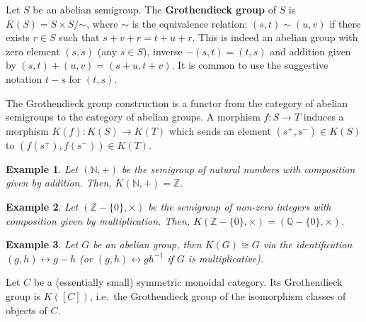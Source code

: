 \documentclass[12pt]{article}
\newcommand*{\Nset}{\mathbb{N}}
\newcommand*{\Zset}{\mathbb{Z}}
\newcommand*{\Qset}{\mathbb{Q}}
\theoremstyle{inlinedefn}
\theoremstyle{break}
\newtheorem{example}{Example}
\begin{document}
Let $S$ be an abelian semigroup.
The \textbf{Grothendieck group} of $S$ is $K(S) = S\times S/\mathord{\sim}$,
where $\sim$ is the equivalence relation:
$(s,t) \sim (u,v)$ if there exists $r \in S$ such that $s+v+r = t+u+r$.
This is indeed an abelian group with zero element $(s,s)$ (any $s \in S$), inverse $-(s,t) = (t,s)$ and addition given by
$(s,t)+(u,v) = (s+u, t+v)$.
It is common to use the suggestive notation $t-s$ for $(t,s)$.

The Grothendieck group construction is a functor from the category of abelian semigroups to the category of abelian groups.
A morphism $f\colon S \to T$ induces a morphism $K(f)\colon K(S) \to K(T)$
which sends an element $(s^+,s^-) \in K(S)$ to $(f(s^+),f(s^-)) \in K(T)$.

\begin{example}
Let $(\Nset,+)$ be the semigroup of natural numbers with composition given by addition.
Then, $K(\Nset,+) = \Zset$.
\end{example}

\begin{example}
Let $(\Zset-\lbrace 0 \rbrace,\times)$ be the semigroup of non-zero integers with composition given by multiplication.
Then, $K(\Zset-\lbrace 0 \rbrace,\times) = (\Qset-\lbrace 0 \rbrace,\times)$.
\end{example}

\begin{example}
Let $G$ be an abelian group, then $K(G) \cong G$ via the identification $(g,h) \leftrightarrow g-h$
(or $(g,h) \leftrightarrow gh^{-1}$ if $G$ is multiplicative).
\end{example}

Let $C$ be a (essentially small) symmetric monoidal category.
Its Grothendieck group is $K([C])$,
i.e.\ the Grothendieck group of the isomorphism classes of objects of $C$.
\end{document}
